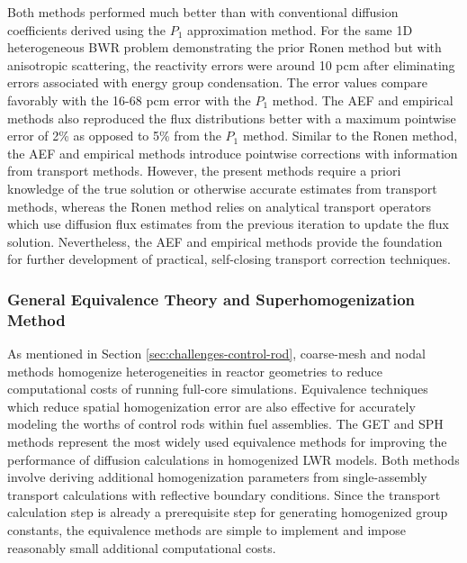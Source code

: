 Both methods performed much better than with conventional diffusion coefficients derived using the
$P_1$ approximation method. For the same 1D heterogeneous \gls{BWR} problem demonstrating the prior
Ronen method \cite{gross_high-accuracy_2020} but with anisotropic scattering, the reactivity errors
were around 10 pcm after eliminating errors associated with energy group condensation. The error
values compare favorably with the 16-68 pcm error with the $P_1$ method. The \gls{AEF} and
empirical methods also reproduced the flux distributions better with a maximum pointwise error of
2\% as opposed to 5\% from the $P_1$ method. Similar to the Ronen method, the \gls{AEF} and
empirical methods introduce pointwise corrections with information from transport methods. However,
the present methods require a priori knowledge of the true solution or otherwise accurate estimates
from transport methods, whereas the Ronen method relies on analytical transport operators which use
diffusion flux estimates from the previous iteration to update the flux solution. Nevertheless, the
\gls{AEF} and empirical methods provide the foundation for further development of practical,
self-closing transport correction techniques.

\subsubsection{General Equivalence Theory and Superhomogenization Method}

As mentioned in Section \ref{sec:challenges-control-rod}, coarse-mesh and nodal methods homogenize
heterogeneities in reactor geometries to reduce computational costs of running full-core
simulations. Equivalence techniques which reduce spatial homogenization error are also effective
for accurately modeling the worths of control rods within fuel assemblies. The \gls{GET}
\cite{koebke_new_1980, smith_nodal_1983} and \gls{SPH} \cite{kavenoky_sph_1978,
hebert_consistent_1991} methods represent the most widely used equivalence methods for improving
the performance of diffusion calculations in homogenized \gls{LWR} models. Both methods involve
deriving additional homogenization parameters from single-assembly transport calculations with
reflective boundary conditions. Since the transport calculation step is already a prerequisite step
for generating homogenized group constants, the equivalence methods are simple to implement and
impose reasonably small additional computational costs.

